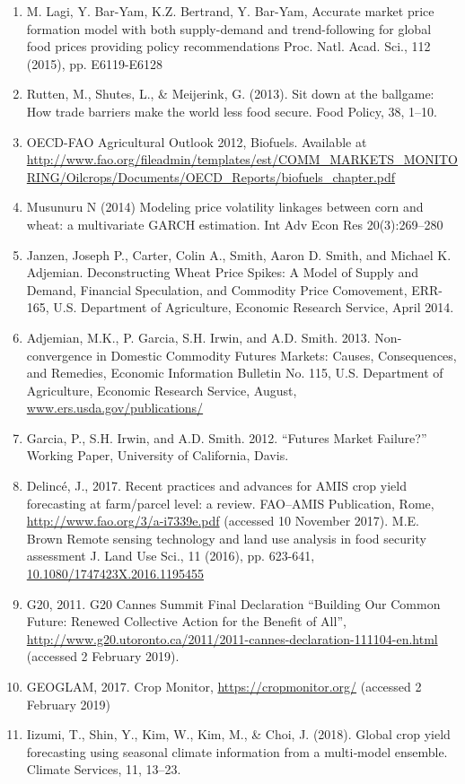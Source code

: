 \documentclass[a4paper,12pt]{article}
\begin{document}
\begin{enumerate}
    \item M. Lagi, Y. Bar-Yam, K.Z. Bertrand, Y. Bar-Yam, Accurate market price formation model with both supply-demand and trend-following for global food prices providing policy recommendations Proc. Natl. Acad. Sci., 112 (2015), pp. E6119-E6128
    \item Rutten, M., Shutes, L., \& Meijerink, G. (2013). Sit down at the ballgame: How trade barriers make the world less food secure. Food Policy, 38, 1–10.
    \item OECD-FAO Agricultural Outlook 2012, Biofuels. Available at \url{ http://www.fao.org/fileadmin/templates/est/COMM_MARKETS_MONITORING/Oilcrops/Documents/OECD_Reports/biofuels_chapter.pdf}
    \item Musunuru N (2014) Modeling price volatility linkages between corn and wheat: a multivariate GARCH estimation. Int Adv Econ Res 20(3):269–280
    \item Janzen, Joseph P., Carter, Colin A., Smith, Aaron D. Smith, and Michael K. Adjemian. Deconstructing Wheat Price Spikes: A Model of Supply and Demand, Financial Speculation, and Commodity Price Comovement, ERR-165, U.S. Department of Agriculture, Economic Research Service, April 2014.
    \item Adjemian, M.K., P. Garcia, S.H. Irwin, and A.D. Smith. 2013. Non-convergence in Domestic Commodity Futures Markets: Causes, Consequences, and Remedies, Economic Information Bulletin No. 115, U.S. Department of Agriculture, Economic Research Service, August, \url{www.ers.usda.gov/publications/}
    \item Garcia, P., S.H. Irwin, and A.D. Smith. 2012. “Futures Market Failure?” Working Paper, University of California, Davis.
    \item    Delincé, J., 2017. Recent practices and advances for AMIS crop yield forecasting at farm/parcel level: a review. FAO–AMIS Publication, Rome, \url{http://www.fao.org/3/a-i7339e.pdf} (accessed 10 November 2017).
M.E. Brown Remote sensing technology and land use analysis in food security assessment J. Land Use Sci., 11 (2016), pp. 623-641, \url{10.1080/1747423X.2016.1195455}
    \item    G20, 2011. G20 Cannes Summit Final Declaration “Building Our Common Future: Renewed Collective Action for the Benefit of All”, \url{http://www.g20.utoronto.ca/2011/2011-cannes-declaration-111104-en.html} (accessed 2 February 2019).
    \item    GEOGLAM, 2017. Crop Monitor, \url{https://cropmonitor.org/} (accessed 2 February 2019)
    \item    Iizumi, T., Shin, Y., Kim, W., Kim, M., \& Choi, J. (2018). Global crop yield forecasting using seasonal climate information from a multi‐model ensemble. Climate Services, 11, 13–23. 
\end{enumerate}
\end{document}
